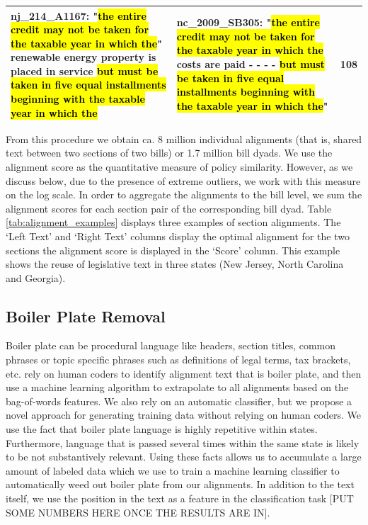 \documentclass[12pt]{article} %
\begin{document}
\begin{table}[ht!]
\begin{tabular}{p{}|p{}|p{}}
\textbf{nj\_214\_A1167}: "\hl{the entire credit may not be taken for the taxable year in which the}" renewable energy property is placed in service \hl{but must be taken in five equal installments beginning with the taxable year in which the} & \textbf{nc\_2009\_SB305}: "\hl{the entire credit may not be taken for the taxable year in which the} costs are paid - - - - \hl{but must be taken in five equal installments beginning with the taxable year in which the}" & 108\\
\hline
\end{tabular}
\egroup
\end{table}

\clearpage

From this procedure we obtain ca. 8 million individual alignments (that is, shared text between two sections of two bills) or 1.7 million bill dyads. We use the alignment score as the quantitative measure of policy similarity. However, as we discuss below, due to the presence of extreme outliers, we work with this measure on the log scale. In order to aggregate the alignments to the bill level, we sum the alignment scores for each section pair of the corresponding bill dyad. Table \ref{tab:alignment_examples} displays three examples of section alignments. The `Left Text' and `Right Text' columns display the optimal alignment for the two sections the alignment score is displayed in the `Score' column. This example shows the reuse of legislative text in three states (New Jersey, North Carolina and Georgia).


\subsection{Boiler Plate Removal}

Boiler plate can be procedural language like headers, section titles, common phrases or topic specific phrases such as definitions of legal terms, tax brackets, etc. \citet{wilkerson2015tracing} rely on human coders to identify alignment text that is boiler plate, and then use a machine learning algorithm to extrapolate to all alignments based on the bag-of-words features.
We also rely on an automatic classifier, but we propose a novel approach for generating training data without relying on human coders. We use the fact that boiler plate language is highly repetitive within states. Furthermore, language that is passed several times within the same state is likely to be not substantively relevant. Using these facts allows us to accumulate a large amount of labeled data which we use to train a machine learning classifier to automatically weed out boiler plate from our alignments. In addition to the text itself, we use the position in the text as a feature in the classification task [PUT SOME NUMBERS HERE ONCE THE RESULTS ARE IN].
\end{document}
